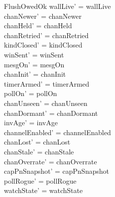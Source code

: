 \documentclass[a4paper,10pt,fleqn]{article}
\begin{document}
\begin{schema}{FlushOwedOk}
  wallLive' = wallLive \\
  chanNewer' = chanNewer \\
  chanHeld' = chanHeld \\
  chanRetried' = chanRetried \\
  kindClosed' = kindClosed \\
  winSent' = winSent \\
  mesgOn' = mesgOn \\
  chanInit' = chanInit \\
  timerArmed' = timerArmed \\
  pollOn' = pollOn \\
  chanUnseen' = chanUnseen \\
  chanDormant' = chanDormant \\
  invAge' = invAge \\
  channelEnabled' = channelEnabled \\
  chanLost' = chanLost \\
  chanStale' = chanStale \\
  chanOverrate' = chanOverrate \\
  capPnSnapshot' = capPnSnapshot \\
  pollRogue' = pollRogue \\
  watchState' = watchState
\end{schema}
\end{document}
